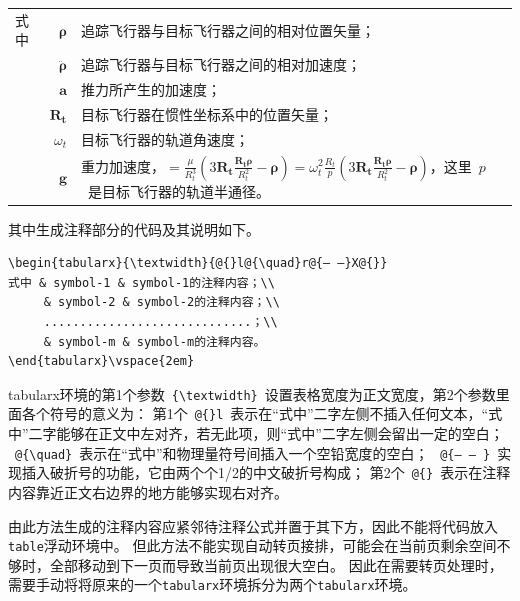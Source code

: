 \begin{tabularx}{\textwidth}{@{}l@{\quad}r@{——}X@{}}
  式中 & $\boldsymbol{\rho}$        & 追踪飞行器与目标飞行器之间的相对位置矢量； \\
       & $\boldsymbol{\ddot{\rho}}$ & 追踪飞行器与目标飞行器之间的相对加速度；   \\
       & $\mathbf{a}$               & 推力所产生的加速度；                       \\
       & $\mathbf{R_t}$             & 目标飞行器在惯性坐标系中的位置矢量；       \\
       & $\omega_{t}$               & 目标飞行器的轨道角速度；                   \\
       & $\mathbf{g}$               & 重力加速度，$=\frac{\mu}{R_{t}^{3}}\left(
    3\mathbf{R_{t}}\frac{\mathbf{R_{t}\rho}}{R_{t}^{2}}-\boldsymbol{\rho}\right)=\omega_{t}^{2}\frac{R_{t}}{p}\left(
    3\mathbf{R_{t}}\frac{\mathbf{R_{t}\rho}}{R_{t}^{2}}-\boldsymbol{\rho}\right)$，这里~$p$~是目标飞行器的轨道半通径。
\end{tabularx}
\vspace{2em}

其中生成注释部分的代码及其说明如下。
\vspace{1em}
\begin{lstlisting}
\begin{tabularx}{\textwidth}{@{}l@{\quad}r@{— —}X@{}}
式中 & symbol-1 & symbol-1的注释内容；\\
     & symbol-2 & symbol-2的注释内容；\\
     .............................；\\
     & symbol-m & symbol-m的注释内容。
\end{tabularx}\vspace{2em}
\end{lstlisting}


tabularx环境的第1个参数~\verb|{\textwidth}|~设置表格宽度为正文宽度，第2个参数里面各个符号的意义为：
第1个~\verb|@{}l|~表示在“式中”二字左侧不插入任何文本，“式中”二字能够在正文中左对齐，若无此项，则“式中”二字左侧会留出一定的空白；
~\verb|@{\quad}|~表示在“式中”和物理量符号间插入一个空铅宽度的空白；
~\verb|@{— — }|~实现插入破折号的功能，它由两个个1/2的中文破折号构成；
第2个~\verb|@{}|~表示在注释内容靠近正文右边界的地方能够实现右对齐。


由此方法生成的注释内容应紧邻待注释公式并置于其下方，因此不能将代码放入\verb|table|浮动环境中。
但此方法不能实现自动转页接排，可能会在当前页剩余空间不够时，全部移动到下一页而导致当前页出现很大空白。
因此在需要转页处理时，需要手动将将原来的一个\verb|tabularx|环境拆分为两个\verb|tabularx|环境。

